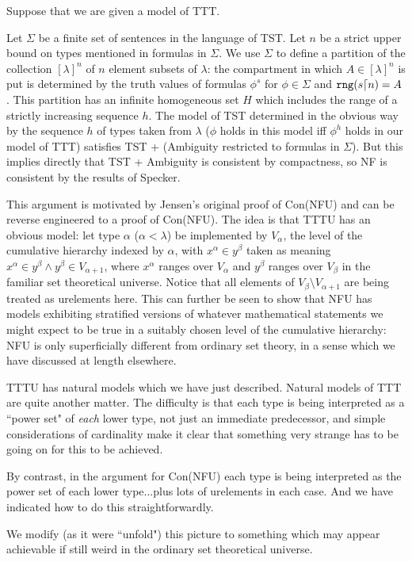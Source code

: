 \documentclass{slides}
\begin{document}
\begin{slide}

Suppose that we are given a model of TTT.

Let $\Sigma$ be a finite set of sentences in the language of TST.  Let $n$ be a strict upper bound on types mentioned in formulas in $\Sigma$.  We use $\Sigma$ to define a partition of the collection $[\lambda]^n$ of $n$ element subsets of $\lambda$:  the compartment in which $A \in [\lambda]^n$ is  put is determined by the truth values of formulas $\phi^s$ for
$\phi \in \Sigma$ and ${\tt rng}(s \lceil n) = A$.  This partition has an infinite homogeneous set $H$ which includes the range of a strictly increasing sequence $h$.  The model of TST determined in the obvious way by the sequence $h$ of types taken from $\lambda$ ($\phi$ holds in this model iff $\phi^h$ holds in our model of TTT) satisfies TST + (Ambiguity restricted to formulas in $\Sigma$).  But this implies directly that TST + Ambiguity is consistent by compactness, so NF is consistent by the results of Specker.

\end{slide}

\begin{slide}

This argument is motivated by Jensen's original proof of Con(NFU) and can be reverse engineered to a proof of Con(NFU).  The idea is that TTTU has an obvious model:
let type $\alpha$ ($\alpha<\lambda$) be implemented by $V_\alpha$, the level of the cumulative hierarchy indexed by $\alpha$, with $x^\alpha \in y^\beta$ taken as
meaning $x^\alpha \in y^\beta \wedge y^\beta \in V_{\alpha+1}$, where $x^{\alpha}$ ranges over $V_\alpha$ and $y^{\beta}$ ranges over $V_{\beta}$ in the familiar set theoretical universe.  Notice that all elements of $V_{\beta} \setminus V_{\alpha+1}$ are being treated as urelements here.  This can further be seen to show that NFU has models exhibiting stratified versions of whatever mathematical statements we might expect to be true in a suitably chosen level of the cumulative hierarchy:  NFU is only superficially different from ordinary set theory, in a sense which we have discussed at length elsewhere.

\end{slide}

\begin{slide}

TTTU has natural models which we have just described.  Natural models of TTT are quite another matter.  The difficulty is that each type is being interpreted as a ``power set"
of {\em each\/} lower type, not just an immediate predecessor, and simple considerations of cardinality make it clear that something very strange has to be going on for this to be achieved.

By contrast, in the argument for Con(NFU) each type is being interpreted as the power set of each lower type...plus lots of urelements in each case.  And we have indicated how to do this straightforwardly.

We modify (as it were ``unfold") this picture to something which may appear achievable if still weird in the ordinary set theoretical universe.

\end{slide}
\end{document}
